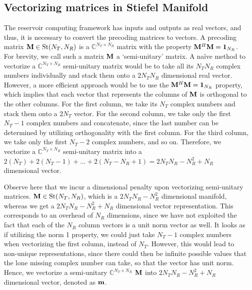 \documentclass[conference]{IEEEtran}
\begin{document}
\subsection{Vectorizing matrices in Stiefel Manifold}
\label{vectorize}
The reservoir computing framework has inputs and outputs as real vectors, and thus, it is necessary to convert the precoding matrices to vectors.
A precoding matrix $\mathcal{{\bf M}} \in \text{St}(N_T,N_R)$ is a $\mathbb{C}^{N_T \times N_R}$ matrix with the property $\mathcal{{\bf M}}^H\mathcal{{\bf M}}=\text{\textbf{1}}_{N_R}$.
For brevity, we call such a matrix $\mathcal{{\bf M}}$ a `semi-unitary' matrix.
A na{\"i}ve method to vectorize a $\mathbb{C}^{N_T \times N_R}$ semi-unitary matrix would be to take all its $N_TN_R$ complex numbers individually and stack them onto a $2N_TN_R$ dimensional real vector.
However, a more efficient approach would be to use the $\mathcal{{\bf M}}^H\mathcal{{\bf M}}=\text{\textbf{1}}_{N_R}$ property, which implies that each vector that represents the columns of $\mathcal{{\bf M}}$ is orthogonal to the other columns.
For the first column, we take its $N_T$ complex numbers and stack them onto a $2N_T$ vector.
For the second column, we take only the first $N_T-1$ complex numbers and concatenate, since the last number can be determined by utilizing orthogonality with the first column.
For the third column, we take only the first $N_T-2$ complex numbers, and so on.
Therefore, we vectorize a $\mathbb{C}^{N_T \times N_R}$ semi-unitary matrix into a $2(N_T)+2(N_T-1)+\ldots+2(N_T-N_R+1)= 2N_TN_R-N_R^2+N_R$ dimensional vector.

Observe here that we incur a dimensional penalty upon vectorizing semi-unitary matrices.
$\mathcal{{\bf M}} \in \text{St}(N_T,N_R)$, which is a $2N_TN_R-N_R^2$ dimensional manifold, whereas we get a $2N_TN_R-N_R^2+N_R$ dimensional vector representation.
This corresponds to an overhead of $N_R$ dimensions, since we have not exploited the fact that each of the $N_R$ column vectors is a unit norm vector as well.
It looks as if utilizing the norm 1 property, we could just take $N_T-1$ complex numbers when vectorizing the first column, instead of $N_T$. However, this would lead to non-unique representations, since there could then be infinite possible values that the lone missing complex number can take, so that the vector has unit norm. Hence, we vectorize a semi-unitary $\mathbb{C}^{N_T \times N_R}$ $\mathcal{{\bf M}}$ into $2N_TN_R-N_R^2+N_R$ dimensional vector, denoted as ${\bf m}$.
\end{document}
